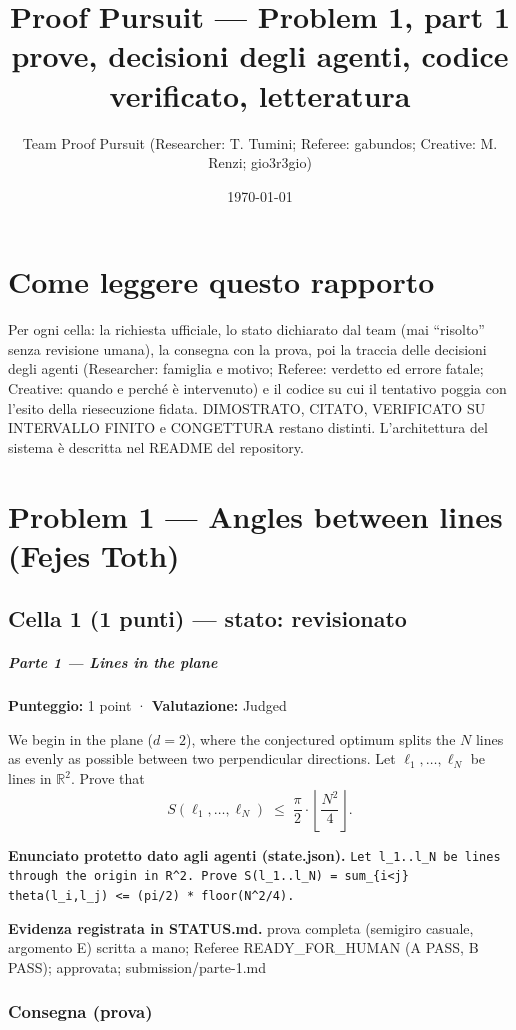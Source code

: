 \documentclass[11pt,a4paper]{article}
\title{Proof Pursuit --- Problem 1, part 1\\ \large prove, decisioni degli agenti, codice verificato, letteratura}
\author{Team Proof Pursuit (Researcher: T. Tumini; Referee: gabundos; Creative: M. Renzi; gio3r3gio)}
\date{\today}
\begin{document}
\maketitle\tableofcontents
\section*{Come leggere questo rapporto}
Per ogni cella: la richiesta ufficiale, lo stato dichiarato dal team (mai ``risolto'' senza revisione umana), la consegna
con la prova, poi la traccia delle decisioni degli agenti (Researcher: famiglia e motivo; Referee: verdetto ed errore
fatale; Creative: quando e perché è intervenuto) e il codice su cui il tentativo poggia con l'esito della riesecuzione
fidata. DIMOSTRATO, CITATO, VERIFICATO SU INTERVALLO FINITO e CONGETTURA restano distinti. L'architettura del sistema
è descritta nel README del repository.
\section{Problem 1 — Angles between lines (Fejes Toth)}
\subsection{Cella 1 (1 punti) — stato: revisionato}
\subparagraph{Parte 1 --- Lines in the
plane}\label{parte-1-lines-in-the-plane}

\textbf{Punteggio:} 1 point · \textbf{Valutazione:} Judged

We begin in the plane (\(d = 2\)), where the conjectured optimum splits
the \(N\) lines as evenly as possible between two perpendicular
directions. Let \(\ell_1, \ldots, \ell_N\) be lines in \(\mathbb{R}^2\).
Prove that \[
S(\ell_1, \ldots, \ell_N) \;\le\; \frac{\pi}{2} \cdot \left\lfloor \frac{N^2}{4} \right\rfloor .
\]

\textbf{Enunciato protetto dato agli agenti (state.json).} \texttt{Let l\_1..l\_N be lines through the origin in R\textasciicircum{}2. Prove S(l\_1..l\_N) = sum\_\{i\textless{}j\} theta(l\_i,l\_j) \textless{}= (pi/2) * floor(N\textasciicircum{}2/4).}

\textbf{Evidenza registrata in STATUS.md.} prova completa (semigiro casuale, argomento E) scritta a mano; Referee READY\_FOR\_HUMAN (A PASS, B PASS); approvata; submission/parte-1.md

\subsubsection{Consegna (prova)}
\end{document}

